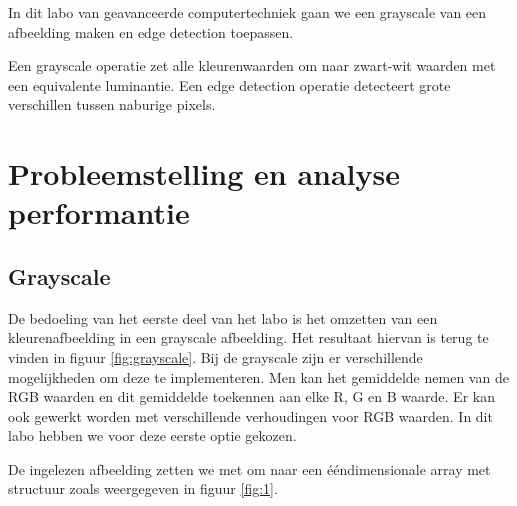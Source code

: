 \documentclass[11pt,twoside,a4paper]{article}
\begin{document}
In dit labo van geavanceerde computertechniek gaan we een grayscale van een afbeelding maken en edge detection toepassen.

Een grayscale operatie zet alle kleurenwaarden om naar zwart-wit waarden met een equivalente luminantie. Een edge detection operatie detecteert grote verschillen tussen naburige pixels.





\section{Probleemstelling en analyse performantie}

\subsection{Grayscale}

De bedoeling van het eerste deel van het labo is het omzetten van een kleurenafbeelding in een grayscale afbeelding. Het resultaat hiervan is terug te vinden in figuur \ref{fig:grayscale}. Bij de grayscale zijn er verschillende mogelijkheden om deze te implementeren. Men kan het gemiddelde nemen van de RGB waarden en dit gemiddelde toekennen aan elke R, G en B waarde. Er kan ook gewerkt worden met verschillende verhoudingen voor RGB waarden. In dit labo hebben we voor deze eerste optie gekozen.

De ingelezen afbeelding zetten we met  om naar een \'e\'endimensionale array met structuur zoals weergegeven in figuur \ref{fig:1}.
\end{document}
